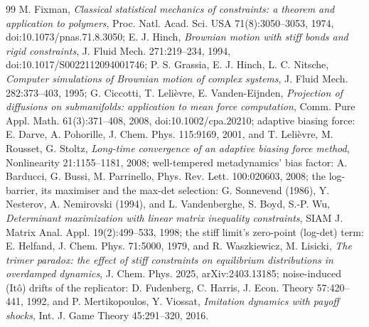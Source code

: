 \begin{thebibliography}{99}
M. Fixman, \emph{Classical statistical mechanics of constraints: a theorem and application to polymers}, Proc. Natl.
Acad. Sci. USA 71(8):3050--3053, 1974, doi:10.1073/pnas.71.8.3050;
E. J. Hinch, \emph{Brownian motion with stiff bonds and rigid constraints}, J. Fluid Mech. 271:219--234, 1994,
doi:10.1017/S0022112094001746;
P. S. Grassia, E. J. Hinch, L. C. Nitsche, \emph{Computer simulations of Brownian motion of complex systems}, J. Fluid
Mech. 282:373--403, 1995;
G. Ciccotti, T. Leli\`evre, E. Vanden-Eijnden, \emph{Projection of diffusions on submanifolds: application to mean
force computation}, Comm. Pure Appl. Math. 61(3):371--408, 2008, doi:10.1002/cpa.20210;
adaptive biasing force: E. Darve, A. Pohorille, J. Chem. Phys. 115:9169, 2001, and T. Leli\`evre, M. Rousset,
G. Stoltz, \emph{Long-time convergence of an adaptive biasing force method}, Nonlinearity 21:1155--1181, 2008;
well-tempered metadynamics' bias factor: A. Barducci, G. Bussi, M. Parrinello, Phys. Rev. Lett. 100:020603, 2008;
the log-barrier, its maximiser and the max-det selection: G. Sonnevend (1986), Y. Nesterov, A. Nemirovski (1994), and
L. Vandenberghe, S. Boyd, S.-P. Wu, \emph{Determinant maximization with linear matrix inequality constraints}, SIAM J.
Matrix Anal. Appl. 19(2):499--533, 1998;
the stiff limit's zero-point (log-det) term: E. Helfand, J. Chem. Phys. 71:5000, 1979, and R. Waszkiewicz,
M. Lisicki, \emph{The trimer paradox: the effect of stiff constraints on equilibrium distributions in overdamped
dynamics}, J. Chem. Phys. 2025, arXiv:2403.13185;
noise-induced (It\^o) drifts of the replicator: D. Fudenberg, C. Harris, J. Econ. Theory 57:420--441, 1992, and
P. Mertikopoulos, Y. Viossat, \emph{Imitation dynamics with payoff shocks}, Int. J. Game Theory 45:291--320, 2016.


\end{thebibliography}
